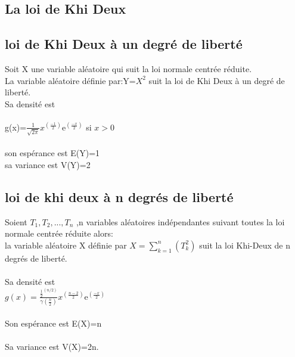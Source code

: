 \documentclass{book}
\begin{document}
\begin{appendices}
   \chapter{La loi de Khi Deux}
      \section{loi de Khi Deux à un degré de liberté }
            Soit X une variable aléatoire qui suit la loi normale centrée réduite.\\La variable aléatoire définie par:Y=$X^2$ suit la loi de Khi Deux à un degré de liberté.\\Sa densité est \\\\g(x)=$\frac{1}{\sqrt{2\pi}}x^(\frac{-1}{2})\mathrm{e}^(\frac{-x}{2})$ si $x>0$\\\\son espérance est E(Y)=1\\sa variance est V(Y)=2\\
       \section{loi de khi deux à n degrés de liberté}Soient $T_1,T_2,...,T_n$ ,n variables aléatoires indépendantes suivant toutes la loi normale centrée réduite alors:\\la variable aléatoire X  définie par $X=\sum_{k=1}^{n} (T_k^2)$ suit la loi Khi-Deux de n degrés de liberté.\\\\Sa densité est\\$g(x)=\frac{\frac{1}{2}^(n/2)}{\gamma(\frac{n}{2})}x^(\frac{n-2}{2})\mathrm{e}^(\frac{-x}{2})$\\\\Son espérance est E(X)=n\\\\Sa variance est V(X)=2n.
      
 
 
        	
        \end{appendices}
        
        
	
		
		
\end{document}
